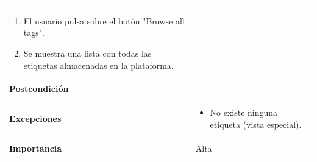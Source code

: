 \documentclass[
]{article}
\providecommand{\tightlist}{%
  \setlength{\itemsep}{0pt}\setlength{\parskip}{0pt}}
\begin{document}
\begin{longtable}[]{@{}ll@{}}
\begin{minipage}[t]{0.72\columnwidth}
\begin{enumerate}
\def\labelenumi{\arabic{enumi}.}
\tightlist
\item
  El usuario pulsa sobre el botón "Browse all tags".
\item
  Se muestra una lista con todas las etiquetas almacenadas en la
  plataforma.
\end{enumerate}\strut
\end{minipage}\tabularnewline
\begin{minipage}[t]{0.22\columnwidth}\raggedright
\textbf{Postcondición}\strut
\end{minipage} & \begin{minipage}[t]{0.72\columnwidth}\raggedright
\strut
\end{minipage}\tabularnewline
\begin{minipage}[t]{0.22\columnwidth}\raggedright
\textbf{Excepciones}\strut
\end{minipage} & \begin{minipage}[t]{0.72\columnwidth}\raggedright
\begin{itemize}
\tightlist
\item
  No existe ninguna etiqueta (vista especial).
\end{itemize}\strut
\end{minipage}\tabularnewline
\begin{minipage}[t]{0.22\columnwidth}\raggedright
\textbf{Importancia}\strut
\end{minipage} & \begin{minipage}[t]{0.72\columnwidth}\raggedright
Alta\strut
\end{minipage}\tabularnewline
\bottomrule
\end{longtable}
\end{document}

